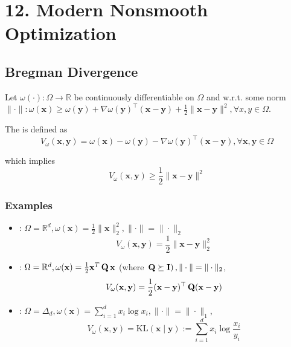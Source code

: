 \section*{12. Modern Nonsmooth Optimization}
\subsection*{Bregman Divergence}
Let $\omega(\cdot): \Omega \rightarrow \mathbb{R}$ be continuously differentiable on $\Omega$ and  w.r.t. some norm $\|\cdot\|: \omega(\mathbf{x}) \geq \omega(\mathbf{y})+\nabla \omega(\mathbf{y})^{\top}(\mathbf{x}-\mathbf{y})+\frac{1}{2}\|\mathbf{x}-\mathbf{y}\|^{2}, \forall x, y \in \Omega$.

The  is defined as
$$
V_{\omega}(\mathbf{x}, \mathbf{y})=\omega(\mathbf{x})-\omega(\mathbf{y})-\nabla \omega(\mathbf{y})^{\top}(\mathbf{x}-\mathbf{y}), \forall \mathbf{x}, \mathbf{y} \in \Omega
$$

which implies
$$
V_{\omega}(\mathbf{x}, \mathbf{y}) \geq \frac{1}{2}\|\mathbf{x}-\mathbf{y}\|^{2}
$$

\subsubsection*{Examples}
\begin{itemize}[leftmargin=*]
    \item {}: $\Omega=\mathbb{R}^{d}, \omega(\mathbf{x})=\frac{1}{2}\|\mathbf{x}\|_{2}^{2},\|\cdot\|=\|\cdot\|_{2}$
$$
V_{\omega}(\mathbf{x}, \mathbf{y})=\frac{1}{2}\|\mathbf{x}-\mathbf{y}\|_{2}^{2}
$$
    \item {}: $\Omega=\mathbb{R}^{d}, \omega(\mathbf{x})=\frac{1}{2} \mathbf{x}^{T} \operatorname{\boldsymbol{\mathbf{Q}}} \mathbf{x}$ (where $\left.\operatorname{\boldsymbol{\mathbf{Q}}} \succeq \operatorname{\boldsymbol{\mathbf{I}}}\right),\|\cdot\|=\|\cdot\|_{2}$,
$$
V_{\omega}(\mathbf{x}, \mathbf{y})=\frac{1}{2}(\mathbf{x}-\mathbf{y})^{\top} \operatorname{\boldsymbol{\mathbf{Q}}}(\mathbf{x}-\mathbf{y})
$$
    \item {}: $\Omega=\Delta_{d}, \omega(\mathbf{x})=\sum_{i=1}^{d} x_{i} \log x_{i},\|\cdot\|=\|\cdot\|_{1}$,
$$
V_{\omega}(\mathbf{x}, \mathbf{y})=\mathrm{KL}(\mathbf{x} \mid \mathbf{y}):=\sum_{i=1}^{d} x_{i} \log \frac{x_{i}}{y_{i}}
$$
\end{itemize}


